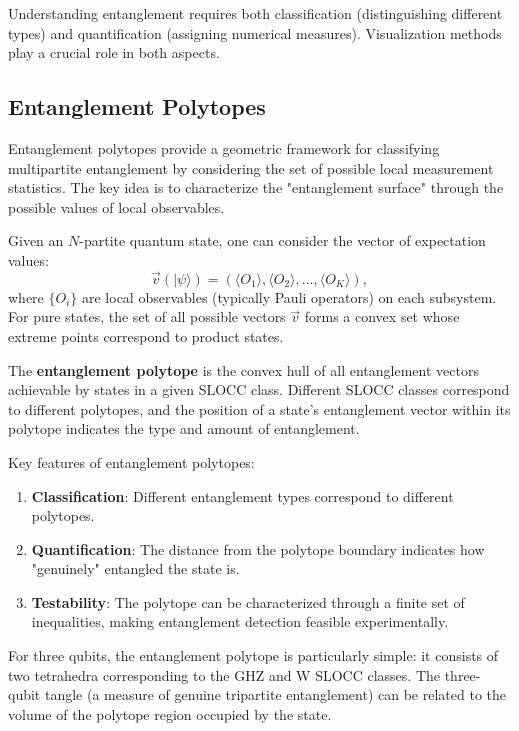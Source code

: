 \documentclass[12pt,a4paper]{article}
\begin{document}
Understanding entanglement requires both classification (distinguishing different types) and quantification (assigning numerical measures). Visualization methods play a crucial role in both aspects.

\subsection{Entanglement Polytopes}
\label{sec:polytopes}

Entanglement polytopes provide a geometric framework for classifying multipartite entanglement by considering the set of possible local measurement statistics. The key idea is to characterize the "entanglement surface" through the possible values of local observables.

Given an $N$-partite quantum state, one can consider the vector of expectation values:
\begin{equation}
	\vec{v}(|\psi\rangle) = (\langle O_1 \rangle, \langle O_2 \rangle, \ldots, \langle O_K \rangle),
\end{equation}
where $\{O_i\}$ are local observables (typically Pauli operators) on each subsystem. For pure states, the set of all possible vectors $\vec{v}$ forms a convex set whose extreme points correspond to product states.

The \textbf{entanglement polytope} is the convex hull of all entanglement vectors achievable by states in a given SLOCC class. Different SLOCC classes correspond to different polytopes, and the position of a state's entanglement vector within its polytope indicates the type and amount of entanglement.

Key features of entanglement polytopes:
\begin{enumerate}
	\item \textbf{Classification}: Different entanglement types correspond to different polytopes.
	\item \textbf{Quantification}: The distance from the polytope boundary indicates how "genuinely" entangled the state is.
	\item \textbf{Testability}: The polytope can be characterized through a finite set of inequalities, making entanglement detection feasible experimentally.
\end{enumerate}

For three qubits, the entanglement polytope is particularly simple: it consists of two tetrahedra corresponding to the GHZ and W SLOCC classes. The three-qubit tangle (a measure of genuine tripartite entanglement) can be related to the volume of the polytope region occupied by the state.
\end{document}
